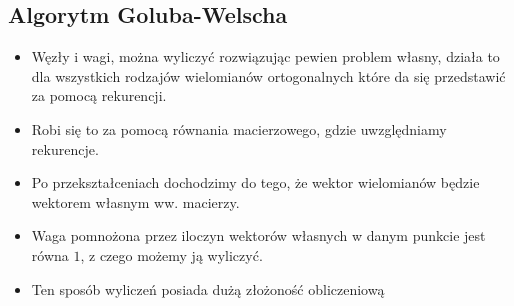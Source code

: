 \documentclass[a4paper]{article}
\begin{document}
\subsection{Algorytm Goluba-Welscha}
\begin{itemize}
    \item Węzły i wagi, można wyliczyć rozwiązując pewien problem własny, działa to dla wszystkich rodzajów wielomianów ortogonalnych które da się przedstawić za pomocą rekurencji.
    \item Robi się to za pomocą równania macierzowego, gdzie uwzględniamy rekurencje.
    \item Po przekształceniach dochodzimy do tego, że wektor wielomianów będzie wektorem własnym ww. macierzy.
    \item Waga pomnożona przez iloczyn wektorów własnych w danym punkcie jest równa $1$, z czego możemy ją wyliczyć.
    \item Ten sposób wyliczeń posiada dużą złożoność obliczeniową
\end{itemize}
\end{document}
